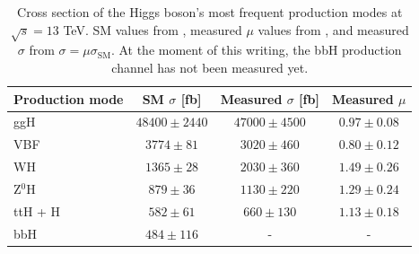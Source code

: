 \begin{table}[ht]
    \centering
    \begin{tabular}{|l|c|c|c|}
        \hline
        \multicolumn{1}{|c|}{\cellcolor{lightgray}Production mode} & \cellcolor{lightgray} SM $\sigma$ [fb] & \cellcolor{lightgray} Measured $\sigma$ [fb] & \cellcolor{lightgray} Measured $\mu$ \\ \hline
        ggH                         & $48400 \pm 2440$          & $47000 \pm 4500$          & $0.97 \pm 0.08$           \\
        VBF                         & $3774 \pm 81$             & $3020 \pm 460$            & $0.80 \pm 0.12$    \\
        WH                          & $1365  \pm 28$            & $2030  \pm 360$           & $1.49 \pm 0.26$     \\
        Z$^0$H                      & $879  \pm 36$             & $1130  \pm 220$           & $1.29 \pm 0.24$    \\
        ttH + H                     & $582  \pm 61$             & $660  \pm 130$             & $1.13 \pm 0.18$    \\
        bbH                         & $484  \pm 116$            & -       & - \\ \hline
    \end{tabular}
    \caption{Cross section of the Higgs boson's most frequent production modes at $\sqrt{s} = 13$ TeV. SM values from \cite{LHCHiggsCrossSectionWorkingGroup:2016ypw}, measured $\mu$ values from \cite{CMS:2022dwd}, and measured $\sigma$ from $\sigma=\mu\sigma_{\text{SM}}$. At the moment of this writing, the bbH production channel has not been measured yet.}
    \label{tab:Higgs_production}
\end{table}

